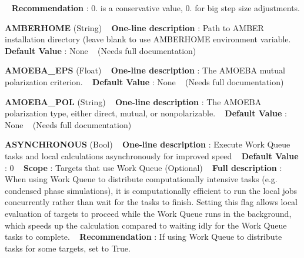 ~\newline
{\bfseries  Recommendation }\+: 0. is a conservative value, 0. for big step size adjustments.

\begin{DoxyItemize}
\item {\bfseries  A\+M\+B\+E\+R\+H\+O\+ME } (String) ~\newline
{\bfseries  One-\/line description }\+: Path to A\+M\+B\+ER installation directory (leave blank to use A\+M\+B\+E\+R\+H\+O\+ME environment variable. ~\newline
{\bfseries  Default Value }\+: None ~\newline
(Needs full documentation)\end{DoxyItemize}
\begin{DoxyItemize}
\item {\bfseries  A\+M\+O\+E\+B\+A\+\_\+\+E\+PS } (Float) ~\newline
{\bfseries  One-\/line description }\+: The A\+M\+O\+E\+BA mutual polarization criterion. ~\newline
{\bfseries  Default Value }\+: None ~\newline
(Needs full documentation)\end{DoxyItemize}
\begin{DoxyItemize}
\item {\bfseries  A\+M\+O\+E\+B\+A\+\_\+\+P\+OL } (String) ~\newline
{\bfseries  One-\/line description }\+: The A\+M\+O\+E\+BA polarization type, either direct, mutual, or nonpolarizable. ~\newline
{\bfseries  Default Value }\+: None ~\newline
(Needs full documentation)\end{DoxyItemize}
\begin{DoxyItemize}
\item {\bfseries  A\+S\+Y\+N\+C\+H\+R\+O\+N\+O\+US } (Bool) ~\newline
{\bfseries  One-\/line description }\+: Execute Work Queue tasks and local calculations asynchronously for improved speed ~\newline
{\bfseries  Default Value }\+: 0 ~\newline
{\bfseries  Scope }\+: Targets that use Work Queue (Optional) ~\newline
{\bfseries  Full description }\+: When using Work Queue to distribute computationally intensive tasks (e.\+g. condensed phase simulations), it is computationally efficient to run the local jobs concurrently rather than wait for the tasks to finish. Setting this flag allows local evaluation of targets to proceed while the Work Queue runs in the background, which speeds up the calculation compared to waiting idly for the Work Queue tasks to complete. ~\newline
{\bfseries  Recommendation }\+: If using Work Queue to distribute tasks for some targets, set to True.\end{DoxyItemize}
